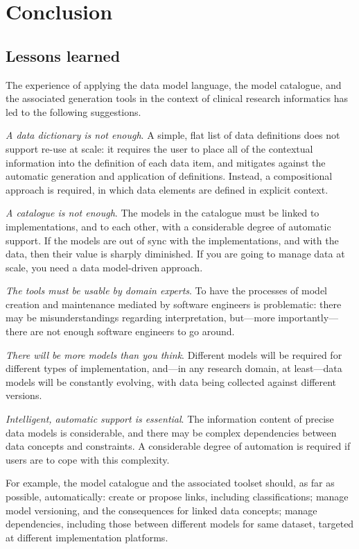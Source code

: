 
\section{Conclusion}

\subsection{Lessons learned}

The experience of applying the data model language, the model
catalogue, and the associated generation tools in the context of
clinical research informatics has led to the following suggestions.

\textsl{A data dictionary is not enough}. A simple, flat list of data
definitions does not support re-use at scale: it requires the user to
place all of the contextual information into the definition of each
data item, and mitigates against the automatic generation and
application of definitions.  Instead, a compositional approach is
required, in which data elements are defined in explicit context.

\textsl{A catalogue is not enough}.  The models in the catalogue must
be linked to implementations, and to each other, with a considerable
degree of automatic support.  If the models are out of sync with the
implementations, and with the data, then their value is sharply
diminished.  If you are going to manage data at scale, you need a data
model-driven approach. 

\textsl{The tools must be usable by domain experts}. To have the
processes of model creation and maintenance mediated by software
engineers is problematic: there may be misunderstandings regarding
interpretation, but---more importantly---there are not enough software
engineers to go around.  

\textsl{There will be more models than you think}.  Different models
will be required for different types of implementation, and---in any
research domain, at least---data models will be constantly evolving,
with data being collected against different versions.  

\textsl{Intelligent, automatic support is essential}. The information
content of precise data models is considerable, and there may be
complex dependencies between data concepts and constraints.  A
considerable degree of automation is required if users are to cope
with this complexity.  

For example, the model catalogue and the associated toolset should, as
far as possible, automatically: create or propose links, including
classifications; manage model versioning, and the consequences for
linked data concepts; manage dependencies, including those between
different models for same dataset, targeted at different
implementation platforms.

